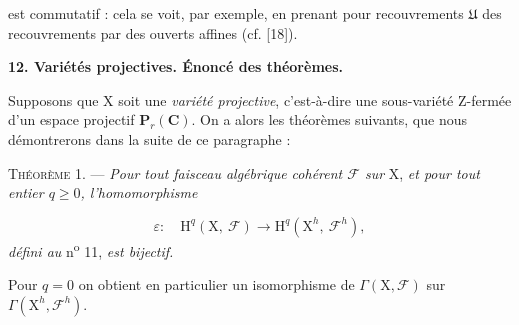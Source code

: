 \begin{center}
\end{center}
est commutatif : cela se voit, par exemple, en prenant pour recouvrements $\mathfrak{U}$ des recouvrements par des ouverts affines (cf. [18]).


\textbf{12. Variétés projectives. Énoncé des théorèmes.}

Supposons que $\mathrm{X}$ soit une \textit{variété projective}, c'est-à-dire une sous-variété $\mathrm{Z}$-fermée d'un espace projectif $\mathbf{P}_r(\mathbf{C})$. On a alors les théorèmes suivants, que nous démontrerons dans la suite de ce paragraphe :

\textsc{Théorème} 1. --- \textit{Pour tout faisceau algébrique cohérent $\mathcal{F}$ sur} $\mathrm{X}$, \textit{et pour tout entier $q \geqslant 0$, l'homomorphisme}

\begin{equation*}
\varepsilon : \quad \mathrm{H}^q(\mathrm{X},\ \mathcal{F}) \longrightarrow \mathrm{H}^q(\mathrm{X}^h,\ \mathcal{F}^h),
\end{equation*}
\textit{défini au} n\textsuperscript{o} 11, \textit{est bijectif.}

Pour $q = 0$ on obtient en particulier un isomorphisme de $\Gamma(\mathrm{X}, \mathcal{F})$ sur $\Gamma(\mathrm{X}^h, \mathcal{F}^h)$.

